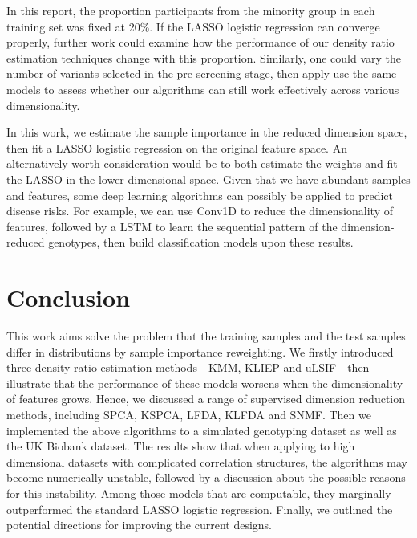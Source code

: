 \documentclass[a4paper,12pt]{article}
\begin{document}
In this report, the proportion participants from the minority group in each training set was fixed at 20\%. If the LASSO logistic regression can converge properly, further work could examine how the performance of our density ratio estimation techniques change with this proportion. Similarly, one could vary the number of variants selected in the pre-screening stage, then apply use the same models to assess whether our algorithms can still work effectively across various dimensionality. 

In this work, we estimate the sample importance in the reduced dimension space, then fit a LASSO logistic regression on the original feature space. An alternatively worth consideration would be to both estimate the weights and fit the LASSO in the lower dimensional space. Given that we have abundant samples and features, some deep learning algorithms can possibly be applied to predict disease risks. For example, we can use Conv1D to reduce the dimensionality of features, followed by a LSTM to learn the sequential pattern of the dimension-reduced genotypes, then build classification models upon these results.

\pagebreak
\section{Conclusion} \label{Conclusion}
This work aims solve the problem that the training samples and the test samples differ in distributions by sample importance reweighting. We firstly introduced three density-ratio estimation methods - KMM, KLIEP and uLSIF - then illustrate that the performance of these models worsens when the dimensionality of features grows. Hence, we discussed a range of supervised dimension reduction methods, including SPCA, KSPCA, LFDA, KLFDA and SNMF. Then we implemented the above algorithms to a simulated genotyping dataset as well as the UK Biobank dataset. The results show that when applying to high dimensional datasets with complicated correlation structures, the algorithms may become numerically unstable, followed by a discussion about the possible reasons for this instability. Among those models that are computable, they marginally outperformed the standard LASSO logistic regression. Finally, we outlined the potential directions for improving the current designs.


%
%
%


\pagebreak


\pagebreak
\end{document}
